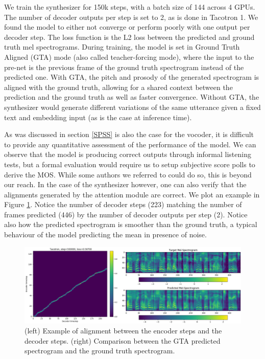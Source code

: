 \documentclass[a4paper, oneside, 12pt, english]{article}
\begin{document}
We train the synthesizer for 150k steps, with a batch size of 144 across 4 GPUs. The number of decoder outputs per step is set to 2, as is done in Tacotron 1. We found the model to either not converge or perform poorly with one output per decoder step. The loss function is the L2 loss between the predicted and ground truth mel spectrograms. During training, the model is set in Ground Truth Aligned (GTA) mode (also called teacher-forcing mode), where the input to the pre-net is the previous frame of the ground truth spectrogram instead of the predicted one. With GTA, the pitch and prosody of the generated spectrogram is aligned with the ground truth, allowing for a shared context between the prediction and the ground truth as well as faster convergence. Without GTA, the synthesizer would generate different variations of the same utterance given a fixed text and embedding input (as is the case at inference time).

As was discussed in section \ref{SPSS} is also the case for the vocoder, it is difficult to provide any quantitative assessment of the performance of the model. We can observe that the model is producing correct outputs through informal listening tests, but a formal evaluation would require us to setup subjective score polls to derive the MOS. While some authors we referred to could do so, this is beyond our reach. In the case of the synthesizer however, one can also verify that the alignments generated by the attention module are correct. We plot an example in Figure \ref{tacotron_alignment}. Notice the number of decoder steps (223) matching the number of frames predicted (446) by the number of decoder outputs per step (2). Notice also how the predicted spectrogram is smoother than the ground truth, a typical behaviour of the model predicting the mean in presence of noise.

\begin{figure}[h]
	\centering
	\includegraphics[width=\linewidth]{images/tacotron_alignment.png}
	\caption{(left) Example of alignment between the encoder steps and the decoder steps. (right) Comparison between the GTA predicted spectrogram and the ground truth spectrogram.}
	\label{tacotron_alignment}
\end{figure}
\end{document}
